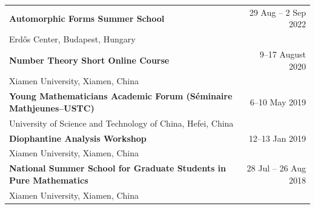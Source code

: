 \begin{tabularx}{\textwidth}{@{}Xr@{}}  %
\textbf{Automorphic Forms Summer School} & 29 Aug -- 2 Sep 2022 \\
Erdős Center, Budapest, Hungary & \\[1ex]

\textbf{Number Theory Short Online Course} & 9--17 August 2020 \\
Xiamen University, Xiamen, China & \\[1ex]

\textbf{Young Mathematicians Academic Forum (Séminaire Mathjeunes--USTC)} & 6--10 May 2019 \\
University of Science and Technology of China, Hefei, China & \\[1ex]

\textbf{Diophantine Analysis Workshop} & 12--13 Jan 2019 \\
Xiamen University, Xiamen, China & \\[1ex]

\textbf{National Summer School for Graduate Students in Pure Mathematics} & 28 Jul -- 26 Aug 2018 \\
Xiamen University, Xiamen, China & \\
\end{tabularx}
